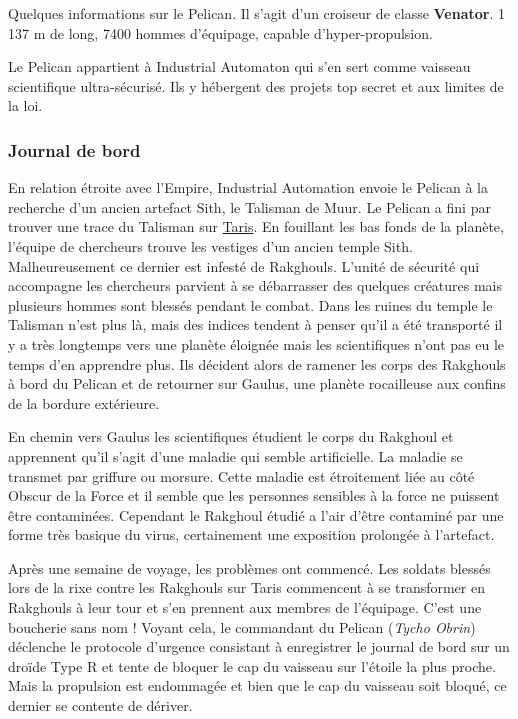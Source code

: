 Quelques informations sur le Pelican. Il s’agit d’un croiseur de classe \textbf{Venator}. 1 137 m de long, 7400 hommes d’équipage, capable d’hyper-propulsion.

Le Pelican appartient à Industrial Automaton qui s’en sert comme vaisseau scientifique ultra-sécurisé. Ils y hébergent des projets top secret et aux limites de la loi.

\subsubsection{Journal de bord}
\label{sec:pelican-jdb}
En relation étroite avec l’Empire, Industrial Automation envoie le Pelican à la recherche d’un ancien artefact Sith, le Talisman de Muur. Le Pelican a fini par trouver une trace du Talisman sur \href{http://fr.starwars.wikia.com/wiki/Taris}{Taris}. En fouillant les bas fonds de la planète, l’équipe de chercheurs trouve les vestiges d'un ancien temple Sith. Malheureusement ce dernier est infesté de Rakghouls. L’unité de sécurité qui accompagne les chercheurs parvient à se débarrasser des quelques créatures mais plusieurs hommes sont blessés pendant le combat. Dans les ruines du temple le Talisman n’est plus là, mais des indices tendent à penser qu’il a été transporté il y a très longtemps vers une planète éloignée mais les scientifiques n’ont pas eu le temps d’en apprendre plus. Ils décident alors de ramener les corps des Rakghouls à bord du Pelican et de retourner sur Gaulus, une planète rocailleuse aux confins de la bordure extérieure.

En chemin vers Gaulus les scientifiques étudient le corps du Rakghoul et apprennent qu’il s’agit d’une maladie qui semble artificielle. La maladie se transmet par griffure ou morsure. Cette maladie est étroitement liée au côté Obscur de la Force et il semble que les personnes sensibles à la force ne puissent être contaminées. Cependant le Rakghoul étudié a l’air d’être contaminé par une forme très basique du virus, certainement une exposition prolongée à l’artefact.

Après une semaine de voyage, les problèmes ont commencé. Les soldats blessés lors de la rixe contre les Rakghouls sur Taris commencent à se transformer en Rakghouls à leur tour et s’en prennent aux membres de l’équipage. C’est une boucherie sans nom ! Voyant cela, le commandant du Pelican (\emph{Tycho Obrin}) déclenche le protocole d’urgence consistant à enregistrer le journal de bord sur un droïde Type R et tente de bloquer le cap du vaisseau sur l’étoile la plus proche. Mais la propulsion est endommagée et bien que le cap du vaisseau soit bloqué, ce dernier se contente de dériver.

